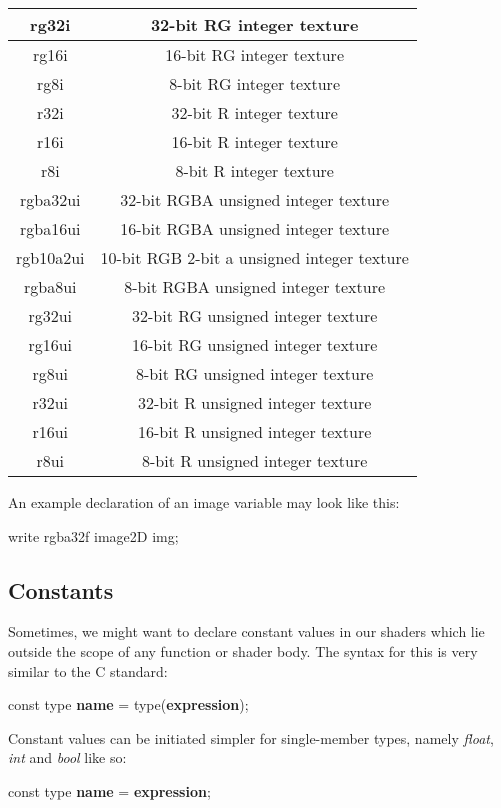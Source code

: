 \documentclass{article}
\newcommand{\SyntaxBox}[1]
{	
	\begin{center}
	\colorbox{orange!60}
	{
		\begin{minipage}{\linewidth}
		\hfill
		\begin{tabbing}
		#1
		\end{tabbing}
		\end{minipage}
	}
	\end{center}
}
\begin{document}
\begin{table}[hp]
{\begin{tabular} {| c | c |}
	rg32i & 32-bit RG integer texture \\ \hline
	rg16i & 16-bit RG integer texture \\ \hline
	rg8i & 8-bit RG integer texture \\ \hline
	r32i & 32-bit R integer texture \\ \hline
	r16i & 16-bit R integer texture \\ \hline
	r8i & 8-bit R integer texture \\ \hline
	rgba32ui & 32-bit RGBA unsigned integer texture \\ \hline
	rgba16ui & 16-bit RGBA unsigned integer texture \\ \hline
	rgb10a2ui & 10-bit RGB 2-bit a unsigned integer texture \\ \hline
	rgba8ui & 8-bit RGBA unsigned integer texture \\ \hline
	rg32ui & 32-bit RG unsigned integer texture \\ \hline
	rg16ui & 16-bit RG unsigned integer texture \\ \hline
	rg8ui & 8-bit RG unsigned integer texture \\ \hline
	r32ui & 32-bit R unsigned integer texture \\ \hline
	r16ui & 16-bit R unsigned integer texture \\ \hline
	r8ui & 8-bit R unsigned integer texture \\ \hline
\end{tabular}
}
\end{table}

An example declaration of an image variable may look like this:

\begin{CodeBox}
write rgba32f image2D img;
\end{CodeBox}

\subsection{Constants}
Sometimes, we might want to declare constant values in our shaders which lie outside the scope of any function or shader body. The syntax for this is very similar to the C standard:

\SyntaxBox
{
	const type \textbf{name} = type(\textbf{expression});
}

Constant values can be initiated simpler for single-member types, namely \textit{float}, \textit{int} and \textit{bool}  like so:

\SyntaxBox
{
	const type \textbf{name} = \textbf{expression};
}
\end{document}
